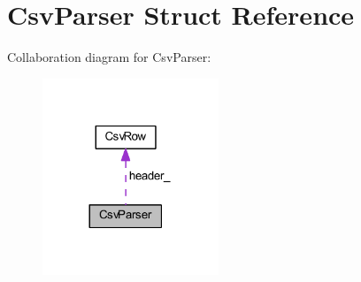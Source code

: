 \hypertarget{struct_csv_parser}{}\section{Csv\+Parser Struct Reference}
\label{struct_csv_parser}


Collaboration diagram for Csv\+Parser\+:\nopagebreak
\begin{figure}[H]
\begin{center}
\leavevmode
\includegraphics[width=149pt]{struct_csv_parser__coll__graph}
\end{center}
\end{figure}

